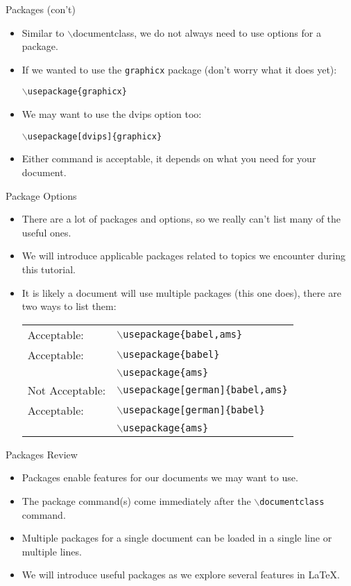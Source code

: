 \documentclass[pdf]{prosper}
\begin{document}
\begin{slide}{Packages (con't)}
	\begin{itemize}
		\item Similar to $\backslash$documentclass, we do not always need to use options for a package.
		\item If we wanted to use the \texttt{graphicx} package (don't worry what it does yet):
			\begin{center}
			\texttt{$\backslash$usepackage\{graphicx\}}
			\end{center}
		\item We may want to use the dvips option too:
			\begin{center}
			\texttt{$\backslash$usepackage[dvips]\{graphicx\}}
			\end{center}
		\item Either command is acceptable, it depends on what you need for your document.
	\end{itemize}
\end{slide}
\begin{slide}{Package Options}
	\begin{itemize}
		\item There are a lot of packages and options, so we really can't list many of the useful ones.
		\item We will introduce applicable packages related to topics we encounter during this tutorial.
		\item It is likely a document will use multiple packages (this one does), there are two ways to list them:
				\begin{tabular}{l l}
				Acceptable: & \texttt{$\backslash$usepackage\{babel,ams\}} \\
				Acceptable: & \texttt{$\backslash$usepackage\{babel\}} \\
										& \texttt{$\backslash$usepackage\{ams\}} \\
				Not Acceptable:	&	\texttt{$\backslash$usepackage[german]\{babel,ams\}} \\
				Acceptable: & \texttt{$\backslash$usepackage[german]\{babel\}} \\
										& \texttt{$\backslash$usepackage\{ams\}}
				\end{tabular}
	\end{itemize}
\end{slide}
\begin{slide}{Packages Review}
	\begin{itemize}
		\item Packages enable features for our documents we may want to use.
		\item The package command(s) come immediately after the \texttt{$\backslash$documentclass} command.
		\item Multiple packages for a single document can be loaded in a single line or multiple lines.
		\item We will introduce useful packages as we explore several features in \LaTeX\mbox{}.
	\end{itemize}
\end{slide}
\end{document}
